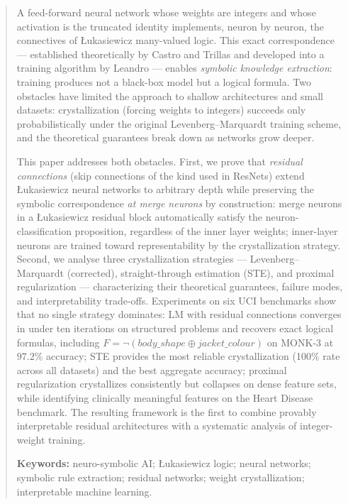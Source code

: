 \documentclass[10pt,a4paper,twoside]{article}
\begin{document}
\begin{abstract}
A feed-forward neural network whose weights are integers and whose activation
is the truncated identity implements, neuron by neuron, the connectives of
\L{}ukasiewicz many-valued logic.
This exact correspondence --- established theoretically by Castro and Trillas
and developed into a training algorithm by Leandro --- enables \emph{symbolic
knowledge extraction}: training produces not a black-box model but a logical
formula.
Two obstacles have limited the approach to shallow architectures and small
datasets: crystallization (forcing weights to integers) succeeds only
probabilistically under the original Levenberg--Marquardt training scheme,
and the theoretical guarantees break down as networks grow deeper.

This paper addresses both obstacles.
First, we prove that \emph{residual connections} (skip connections of the kind
used in ResNets) extend \L{}ukasiewicz neural networks to arbitrary depth while
preserving the symbolic correspondence \emph{at merge neurons} by
construction: merge neurons in a \L{}ukasiewicz residual block automatically
satisfy the neuron-classification proposition, regardless of the inner layer
weights; inner-layer neurons are trained toward representability by the
crystallization strategy.
Second, we analyse three crystallization strategies --- Levenberg--Marquardt
(corrected), straight-through estimation (STE), and proximal regularization ---
characterizing their theoretical guarantees, failure modes, and
interpretability trade-offs.
Experiments on six UCI benchmarks show that no single strategy dominates:
LM with residual connections converges in under ten iterations on structured
problems and recovers exact logical formulas, including
$F = \neg(\mathit{body\_shape} \oplus \mathit{jacket\_colour})$ on MONK-3 at
$97.2\%$ accuracy; STE provides the most reliable crystallization (100\% rate
across all datasets) and the best aggregate accuracy; proximal regularization
crystallizes consistently but collapses on dense feature sets, while
identifying clinically meaningful features on the Heart Disease benchmark.
The resulting framework is the first to combine provably interpretable residual
architectures with a systematic analysis of integer-weight training.

\noindent\textbf{Keywords:} neuro-symbolic AI; \L{}ukasiewicz logic; neural networks;
symbolic rule extraction; residual networks; weight crystallization; interpretable
machine learning.
\end{abstract}
\end{document}
